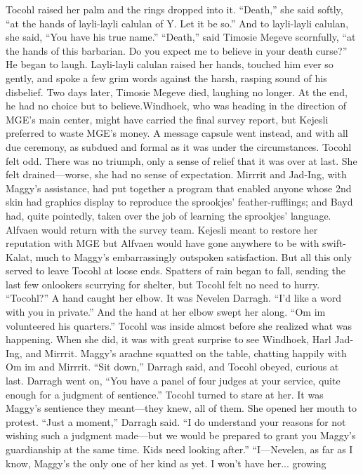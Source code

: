 \documentclass[9pt]{article}
\begin{document}
Tocohl raised her palm and the rings dropped into it. “Death,” she said softly, “at the hands of
layli-layli calulan of Y. Let it be so.” And to layli-layli calulan, she said, “You have his true name.”
“Death,” said Timosie Megeve scornfully, “at the hands of this barbarian. Do you expect me to
believe in your death curse?” He began to laugh. Layli-layli calulan raised her hands, touched him ever
so gently, and spoke a few grim words against the harsh, rasping sound of his disbelief.
Two days later, Timosie Megeve died, laughing no longer. At the end, he had no choice but to
believe.Windhoek, who was heading in the direction of MGE’s main center, might have carried the final
survey report, but Kejesli preferred to waste MGE’s money. A message capsule went instead, and with
all due ceremony, as subdued and formal as it was under the circumstances.
Tocohl felt odd. There was no triumph, only a sense of relief that it was over at last. She felt
drained—worse, she had no sense of expectation.
Mirrrit and Jad-Ing, with Maggy’s assistance, had put together a program that enabled anyone
whose 2nd skin had graphics display to reproduce the sprookjes’ feather-rufflings; and Bayd had, quite
pointedly, taken over the job of learning the sprookjes’ language.
Alfvaen would return with the survey team. Kejesli meant to restore her reputation with MGE but
Alfvaen would have gone anywhere to be with swift-Kalat, much to Maggy’s embarrassingly outspoken
satisfaction.
But all this only served to leave Tocohl at loose ends. Spatters of rain began to fall, sending the last
few onlookers scurrying for shelter, but Tocohl felt no need to hurry.
“Tocohl?” A hand caught her elbow. It was Nevelen Darragh. “I’d like a word with you in private.”
And the hand at her elbow swept her along. “Om im volunteered his quarters.”
Tocohl was inside almost before she realized what was happening. When she did, it was with great
surprise to see Windhoek, Harl Jad-Ing, and Mirrrit. Maggy’s arachne squatted on the table, chatting
happily with Om im and Mirrrit.
“Sit down,” Darragh said, and Tocohl obeyed, curious at last. Darragh went on, “You have a panel
of four judges at your service, quite enough for a judgment of sentience.”
Tocohl turned to stare at her. It was Maggy’s sentience they meant—they knew, all of them. She
opened her mouth to protest.
“Just a moment,” Darragh said. “I do understand your reasons for not wishing such a judgment
made—but we would be prepared to grant you Maggy’s guardianship at the same time. Kids need
looking after.”
“I—Nevelen, as far as I know, Maggy’s the only one of her kind as yet. I won’t have her... growing
\end{document}

